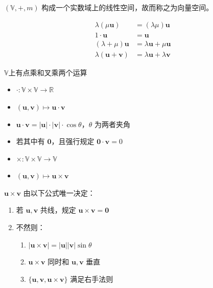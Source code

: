 \documentclass[lang=cn,10pt,thmcnt=section]{elegantbook}
\renewcommand{\vec}[1]{\mathbf{#1}}
\begin{document}
\begin{proposition}
    $(\mathbb{V}, +, m)$ 构成一个实数域上的线性空间，故而称之为向量空间。

    \begin{equation*}
        \begin{split}
            \lambda (\mu \vec{u}) &= (\lambda \mu) \vec{u}\\
            1 \cdot \vec{u} &= \vec{u}\\  
            (\lambda + \mu) \vec{u} &= \lambda \vec{u} + \mu \vec{u}\\
            \lambda (\vec{u} + \vec{v})& = \lambda \vec{u} + \lambda \vec{v}
        \end{split}
     \end{equation*}
\end{proposition}
    
 $\mathbb{V}$上有点乘和叉乘两个运算

\begin{definition}[点积]
    \begin{itemize}
        \item $\cdot : \mathbb{V} \times \mathbb{V} \rightarrow \mathbb{R}$
        \item $(\vec{u}, \vec{v}) \mapsto \vec{u} \cdot \vec{v}$
        \item $\vec{u} \cdot \vec{v} = |\vec{u}| \cdot |\vec{v}| \cdot \cos \theta$，$\theta$ 为两者夹角
        \item 若其中有 $\vec{0}$，且强行规定 $\vec{0} \cdot \vec{v} = 0$
    \end{itemize}
\end{definition}

\begin{definition}[叉积]
    \begin{itemize}
        \item $\times : \mathbb{V} \times \mathbb{V} \rightarrow \mathbb{V}$
        \item $(\vec{u}, \vec{v}) \mapsto \vec{u} \times \vec{v}$
    \end{itemize}
    
    $\vec{u} \times \vec{v}$ 由以下公式唯一决定：
    \begin{enumerate}
        \item 若 $\vec{u}, \vec{v}$ 共线，规定 $\vec{u} \times \vec{v} = \vec{0}$
        \item 不然则：
        \begin{enumerate}
            \item $|\vec{u} \times \vec{v}| = |\vec{u}| |\vec{v}| \sin \theta$
            \item $\vec{u} \times \vec{v}$ 同时和 $\vec{u}, \vec{v}$ 垂直
            \item $\{\vec{u}, \vec{v}, \vec{u} \times \vec{v}\}$ 满足右手法则
        \end{enumerate}
    \end{enumerate}

\end{definition}
\end{document}
